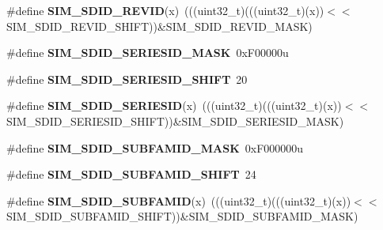 \begin{DoxyCompactItemize}
\item 
\#define {\bfseries S\+I\+M\+\_\+\+S\+D\+I\+D\+\_\+\+R\+E\+V\+ID}(x)~(((uint32\+\_\+t)(((uint32\+\_\+t)(x))$<$$<$S\+I\+M\+\_\+\+S\+D\+I\+D\+\_\+\+R\+E\+V\+I\+D\+\_\+\+S\+H\+I\+FT))\&S\+I\+M\+\_\+\+S\+D\+I\+D\+\_\+\+R\+E\+V\+I\+D\+\_\+\+M\+A\+SK)\hypertarget{group__SIM__Register__Masks_gac72e070db07acc8b7964eb21ab91272f}{}\label{group__SIM__Register__Masks_gac72e070db07acc8b7964eb21ab91272f}

\item 
\#define {\bfseries S\+I\+M\+\_\+\+S\+D\+I\+D\+\_\+\+S\+E\+R\+I\+E\+S\+I\+D\+\_\+\+M\+A\+SK}~0x\+F00000u\hypertarget{group__SIM__Register__Masks_ga014f6aec38e92afbd07904db6ed617d0}{}\label{group__SIM__Register__Masks_ga014f6aec38e92afbd07904db6ed617d0}

\item 
\#define {\bfseries S\+I\+M\+\_\+\+S\+D\+I\+D\+\_\+\+S\+E\+R\+I\+E\+S\+I\+D\+\_\+\+S\+H\+I\+FT}~20\hypertarget{group__SIM__Register__Masks_ga47e31524526fda3e3058a55da89d098b}{}\label{group__SIM__Register__Masks_ga47e31524526fda3e3058a55da89d098b}

\item 
\#define {\bfseries S\+I\+M\+\_\+\+S\+D\+I\+D\+\_\+\+S\+E\+R\+I\+E\+S\+ID}(x)~(((uint32\+\_\+t)(((uint32\+\_\+t)(x))$<$$<$S\+I\+M\+\_\+\+S\+D\+I\+D\+\_\+\+S\+E\+R\+I\+E\+S\+I\+D\+\_\+\+S\+H\+I\+FT))\&S\+I\+M\+\_\+\+S\+D\+I\+D\+\_\+\+S\+E\+R\+I\+E\+S\+I\+D\+\_\+\+M\+A\+SK)\hypertarget{group__SIM__Register__Masks_gaef9ed54f0f9c0105ed9e07608e9a5f69}{}\label{group__SIM__Register__Masks_gaef9ed54f0f9c0105ed9e07608e9a5f69}

\item 
\#define {\bfseries S\+I\+M\+\_\+\+S\+D\+I\+D\+\_\+\+S\+U\+B\+F\+A\+M\+I\+D\+\_\+\+M\+A\+SK}~0x\+F000000u\hypertarget{group__SIM__Register__Masks_ga530d8fe59d2589cf56c00456e89487aa}{}\label{group__SIM__Register__Masks_ga530d8fe59d2589cf56c00456e89487aa}

\item 
\#define {\bfseries S\+I\+M\+\_\+\+S\+D\+I\+D\+\_\+\+S\+U\+B\+F\+A\+M\+I\+D\+\_\+\+S\+H\+I\+FT}~24\hypertarget{group__SIM__Register__Masks_ga5e40d63bf136287a591bb4fa0b019aba}{}\label{group__SIM__Register__Masks_ga5e40d63bf136287a591bb4fa0b019aba}

\item 
\#define {\bfseries S\+I\+M\+\_\+\+S\+D\+I\+D\+\_\+\+S\+U\+B\+F\+A\+M\+ID}(x)~(((uint32\+\_\+t)(((uint32\+\_\+t)(x))$<$$<$S\+I\+M\+\_\+\+S\+D\+I\+D\+\_\+\+S\+U\+B\+F\+A\+M\+I\+D\+\_\+\+S\+H\+I\+FT))\&S\+I\+M\+\_\+\+S\+D\+I\+D\+\_\+\+S\+U\+B\+F\+A\+M\+I\+D\+\_\+\+M\+A\+SK)\hypertarget{group__SIM__Register__Masks_gaba1b690ef87b8401c561fdb1ac2248f0}{}\label{group__SIM__Register__Masks_gaba1b690ef87b8401c561fdb1ac2248f0}


\end{DoxyCompactItemize}
